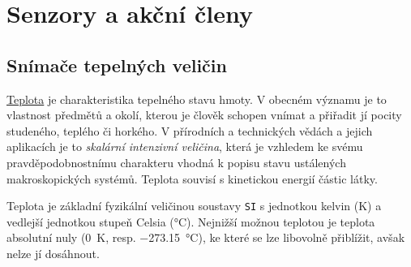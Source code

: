 \setchaptertoc
\chapter{Senzory a akční členy}
  \section{Snímače tepelných veličin}
    \href{http://cs.wikipedia.org/wiki/Teplota}{Teplota} je charakteristika tepelného stavu hmoty.
    V obecném významu je to vlastnost předmětů a okolí, kterou je člověk schopen vnímat a přiřadit
    jí pocity studeného, teplého či horkého. V přírodních a technických vědách a jejich aplikacích
    je to \emph{skalární intenzivní veličina}, která je vzhledem ke svému pravděpodobnostnímu
    charakteru vhodná k popisu stavu ustálených makroskopických systémů. Teplota souvisí s
    kinetickou energií částic látky.

    Teplota je základní fyzikální veličinou soustavy \texttt{SI} s jednotkou kelvin (\unit{\kelvin}) a
    vedlejší jednotkou stupeň Celsia (\unit{\degreeCelsius}). Nejnižší možnou teplotou je teplota
    absolutní nuly (\qty{0}{\kelvin}, resp. \qty{-273.15}{\degreeCelsius}), ke které se lze libovolně
    přiblížit, avšak nelze jí dosáhnout.
         
